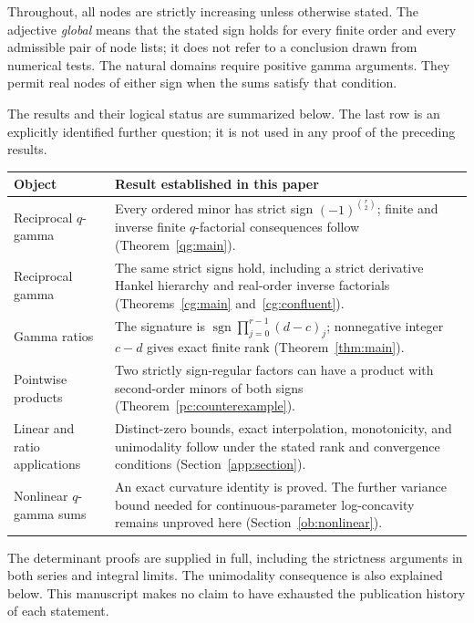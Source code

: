 \documentclass[11pt,a4paper]{article}
\theoremstyle{definition}
\theoremstyle{remark}
\DeclareMathOperator{\sgn}{sgn}
\begin{document}
Throughout, all nodes are strictly increasing unless otherwise stated.
The adjective \emph{global} means that the stated sign holds for every
finite order and every admissible pair of node lists; it does not refer
to a conclusion drawn from numerical tests. The natural domains require
positive gamma arguments. They permit real nodes of either sign when
the sums satisfy that condition.

The results and their logical status are summarized below. The last row
is an explicitly identified further question; it is not used in any
proof of the preceding results.

\begin{center}
\small
\begin{tabular}{@{}p{}p{}@{}}
\toprule
Object & Result established in this paper\\
\midrule
Reciprocal \(q\)-gamma & Every ordered minor has strict sign
\((-1)^{\binom r2}\); finite and inverse finite \(q\)-factorial
consequences follow (Theorem~\ref{qg:main}).\\[0.45em]
Reciprocal gamma & The same strict signs hold, including a strict
derivative Hankel hierarchy and real-order inverse factorials
(Theorems~\ref{cg:main} and~\ref{cg:confluent}).\\[0.45em]
Gamma ratios & The signature is
\(\sgn\prod_{j=0}^{r-1}(d-c)_j\); nonnegative integer
\(c-d\) gives exact finite rank (Theorem~\ref{thm:main}).\\[0.45em]
Pointwise products & Two strictly sign-regular factors can have a
product with second-order minors of both signs
(Theorem~\ref{pc:counterexample}).\\[0.45em]
Linear and ratio applications & Distinct-zero bounds, exact
interpolation, monotonicity, and unimodality follow under the stated
rank and convergence conditions (Section~\ref{app:section}).\\[0.45em]
Nonlinear \(q\)-gamma sums & An exact curvature identity is proved.
The further variance bound needed for continuous-parameter
log-concavity remains unproved here (Section~\ref{ob:nonlinear}).\\
\bottomrule
\end{tabular}
\end{center}

The determinant proofs are supplied in full, including the strictness
arguments in both series and integral limits. The unimodality
consequence is also explained below. This manuscript makes no claim to
have exhausted the publication history of each statement.
\end{document}
